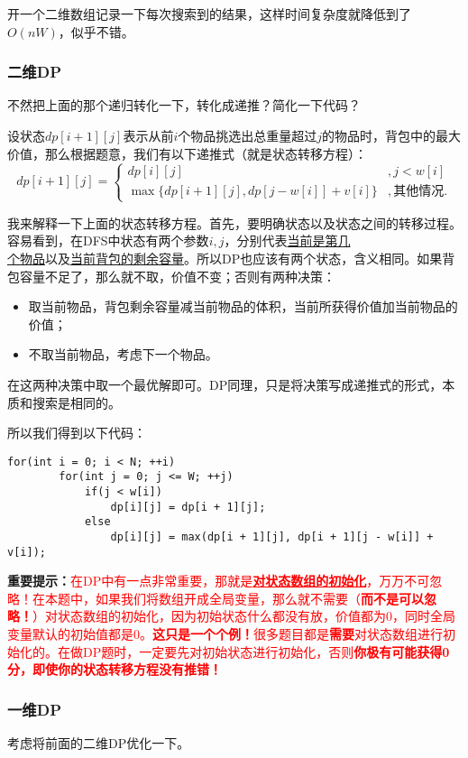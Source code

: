 开一个二维数组记录一下每次搜索到的结果，这样时间复杂度就降低到了$O(nW)$，似乎不错。
\subsubsection{二维DP}
不然把上面的那个递归转化一下，转化成递推？简化一下代码？

设状态$dp[i+1][j]$表示从前$i$个物品挑选出总重量超过$j$的物品时，背包中的最大价值，那么根据题意，我们有以下递推式（就是状态转移方程）：
\begin{equation*}
	dp[i+1][j]=\begin{cases}
		dp[i][j]                        & ,j<w[i]   \\
		\max\{dp[i+1][j],dp[j-w[i]]+v[i]\} & ,其他情况.
	\end{cases}
\end{equation*}

我来解释一下上面的状态转移方程。首先，要明确状态以及状态之间的转移过程。容易看到，在DFS中状态有两个参数$i,j$，分别代表\underline{当前是第几}\\\underline{个物品}以及\underline{当前背包的剩余容量}。所以DP也应该有两个状态，含义相同。如果背包容量不足了，那么就不取，价值不变；否则有两种决策：
\begin{itemize}
	\item{取当前物品，背包剩余容量减当前物品的体积，当前所获得价值加当前物品的价值；}
	\item{不取当前物品，考虑下一个物品。}
\end{itemize}

在这两种决策中取一个最优解即可。DP同理，只是将决策写成递推式的形式，本质和搜索是相同的。

所以我们得到以下代码：

\begin{verbatim}
for(int i = 0; i < N; ++i)
        for(int j = 0; j <= W; ++j)
            if(j < w[i])
                dp[i][j] = dp[i + 1][j];
            else
                dp[i][j] = max(dp[i + 1][j], dp[i + 1][j - w[i]] + v[i]);
\end{verbatim}
\textbf{重要提示：}\textcolor{red}{在DP中有一点非常重要，那就是\underline{\textbf{对状态数组的初始化}}，万万不可忽略！在本题中，如果我们将数组开成全局变量，那么就不需要（\textbf{而不是可以忽略！}）对状态数组的初始化，因为初始状态什么都没有放，价值都为0，同时全局变量默认的初始值都是0。\textbf{这只是一个个例！}很多题目都是\textbf{需要}对状态数组进行初始化的。在做DP题时，一定要先对初始状态进行初始化，否则\textbf{你极有可能获得0分，即使你的状态转移方程没有推错！}}
\subsubsection{一维DP}
考虑将前面的二维DP优化一下。

